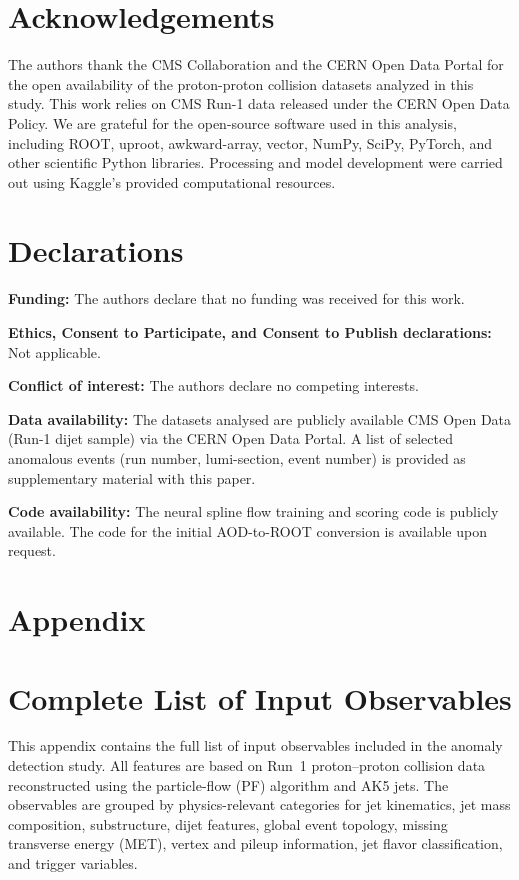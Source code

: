 \documentclass[11pt,a4paper,twocolumn]{article}
\begin{document}
\section*{Acknowledgements}

The authors thank the CMS Collaboration and the CERN Open Data Portal for the open availability of the proton-proton collision datasets analyzed in this study. This work relies on CMS Run-1 data released under the CERN Open Data Policy. We are grateful for the open-source software used in this analysis, including ROOT, uproot, awkward-array, vector, NumPy, SciPy, PyTorch, and other scientific Python libraries. Processing and model development were carried out using Kaggle's provided computational resources.

\section*{Declarations}

\noindent\textbf{Funding:} The authors declare that no funding was received for this work.

\noindent\textbf{Ethics, Consent to Participate, and Consent to Publish declarations:} Not applicable.

\noindent\textbf{Conflict of interest:} The authors declare no competing interests.

\noindent\textbf{Data availability:} The datasets analysed are publicly available CMS Open Data (Run-1 dijet sample) via the CERN Open Data Portal. A list of selected anomalous events (run number, lumi-section, event number) is provided as supplementary material with this paper.

\noindent\textbf{Code availability:} The neural spline flow training and scoring code is publicly available. The code for the initial AOD-to-ROOT conversion is available upon request.

\clearpage
\onecolumn
\section*{Appendix}

\section{Complete List of Input Observables}
\label{app:observables}

This appendix contains the full list of input observables included in the anomaly detection study. 
All features are based on Run~1 proton--proton collision data reconstructed using the particle-flow (PF) algorithm and AK5 jets.
The observables are grouped by physics-relevant categories for jet kinematics, jet mass composition, substructure, dijet features, global event topology, missing transverse energy (MET), vertex and pileup information, jet flavor classification, and trigger variables.
\end{document}
